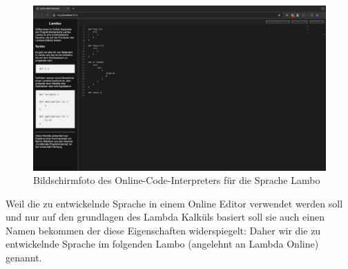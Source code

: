 \documentclass[ngerman]{article}
\begin{document}
\begin{figure}
    \centering
    \includegraphics[width=1\textwidth]{screenshot.png}
    \caption{Bildschirmfoto des Online-Code-Interpreters für die Sprache Lambo\cite{lamboweb}}
    \label{fig:lambowebsite}
\end{figure}

Weil die zu entwickelnde Sprache in einem Online Editor verwendet werden soll und nur auf den grundlagen des Lambda Kalküls basiert soll sie auch einen Namen bekommen der diese Eigenschaften widerspiegelt:
Daher wir die zu entwickelnde Sprache im folgenden Lambo (angelehnt an Lambda Online) genannt.
\end{document}
